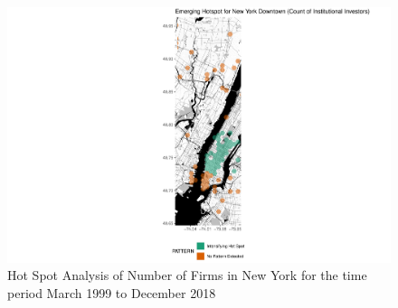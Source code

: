 \begin{figure}
	\centering
	\includegraphics[width=1\linewidth]{Figures/ChapterIV/NY_Count_EH_Downtown}
	\caption[Hot Spot Analysis of Number of Firms in Downtown New York 1999-2018]{Hot Spot Analysis of Number of Firms in New York for the time period March 1999 to December 2018}
	\label{fig:NYCcounthotspot_Downtown}
\end{figure}

